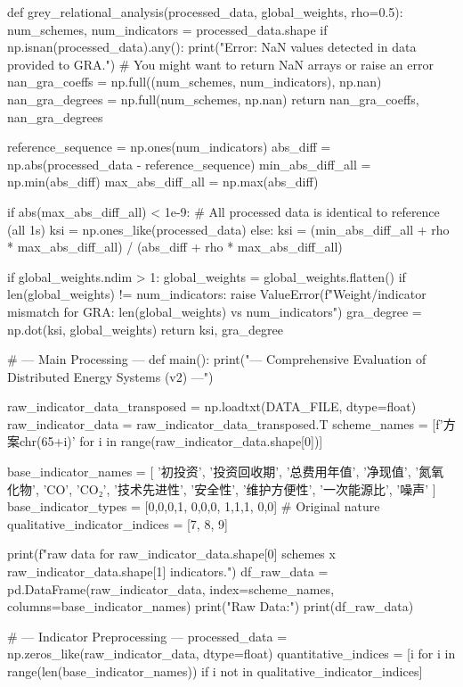\documentclass[12pt]{ctexart}
\begin{document}
\begin{python}
def grey_relational_analysis(processed_data, global_weights, rho=0.5):
    num_schemes, num_indicators = processed_data.shape
    if np.isnan(processed_data).any():
        print("Error: NaN values detected in data provided to GRA.")
        # You might want to return NaN arrays or raise an error
        nan_gra_coeffs = np.full((num_schemes, num_indicators), np.nan)
        nan_gra_degrees = np.full(num_schemes, np.nan)
        return nan_gra_coeffs, nan_gra_degrees

    reference_sequence = np.ones(num_indicators)
    abs_diff = np.abs(processed_data - reference_sequence)
    min_abs_diff_all = np.min(abs_diff)
    max_abs_diff_all = np.max(abs_diff)

    if abs(max_abs_diff_all) < 1e-9: # All processed data is identical to reference (all 1s)
        ksi = np.ones_like(processed_data)
    else:
        ksi = (min_abs_diff_all + rho * max_abs_diff_all) / (abs_diff + rho * max_abs_diff_all)
    
    if global_weights.ndim > 1: global_weights = global_weights.flatten()
    if len(global_weights) != num_indicators:
        raise ValueError(f"Weight/indicator mismatch for GRA: {len(global_weights)} vs {num_indicators}")
    gra_degree = np.dot(ksi, global_weights)
    return ksi, gra_degree

# --- Main Processing ---
def main():
    print("--- Comprehensive Evaluation of Distributed Energy Systems (v2) ---")

    raw_indicator_data_transposed = np.loadtxt(DATA_FILE, dtype=float)
    raw_indicator_data = raw_indicator_data_transposed.T
    scheme_names = [f'方案{chr(65+i)}' for i in range(raw_indicator_data.shape[0])]
    
    base_indicator_names = [
        '初投资', '投资回收期', '总费用年值', '净现值',
        '氮氧化物', 'CO', 'CO₂',
        '技术先进性', '安全性', '维护方便性',
        '一次能源比', '噪声'
    ]
    base_indicator_types = [0,0,0,1, 0,0,0, 1,1,1, 0,0] # Original nature
    qualitative_indicator_indices = [7, 8, 9]

    print(f"\nLoaded raw data for {raw_indicator_data.shape[0]} schemes x {raw_indicator_data.shape[1]} indicators.")
    df_raw_data = pd.DataFrame(raw_indicator_data, index=scheme_names, columns=base_indicator_names)
    print("Raw Data:")
    print(df_raw_data)

    # --- Indicator Preprocessing ---
    processed_data = np.zeros_like(raw_indicator_data, dtype=float)
    quantitative_indices = [i for i in range(len(base_indicator_names)) if i not in qualitative_indicator_indices]
    

\end{python}
\end{document}
